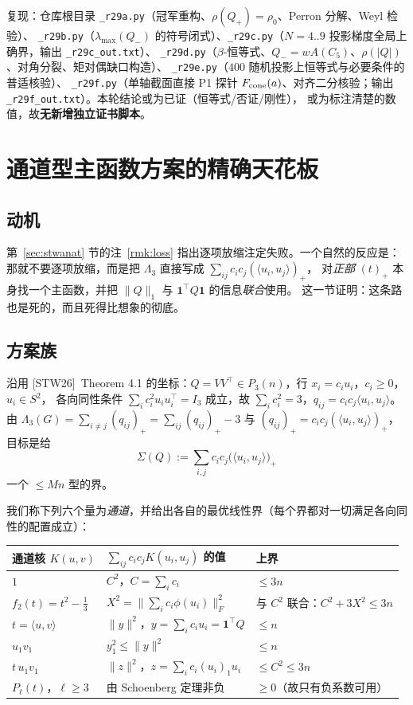 \documentclass[UTF8,11pt]{ctexart}
\theoremstyle{definition}
\newcommand{\Lam}{\Lambda}
\newcommand{\one}{\mathbf{1}}
\newcommand{\STW}{\textup{[STW26]}}
\begin{document}
复现：仓库根目录 \texttt{\_r29a.py}（冠军重构、$\rho(Q_+)=\rho_0$、Perron 分解、Weyl 检验）、
\texttt{\_r29b.py}（$\lambda_{\max}(Q_-)$ 的符号闭式）、\texttt{\_r29c.py}（$N=4..9$ 投影梯度全局上确界，输出 \texttt{\_r29c\_out.txt}）、
\texttt{\_r29d.py}（$\beta$-恒等式、$Q_-=wA(C_5)$、$\rho(|Q|)$、对角分裂、矩对偶缺口构造）、
\texttt{\_r29e.py}（$400$ 随机投影上恒等式与必要条件的普适核验）、
\texttt{\_r29f.py}（单轴截面直接 P1 探针 $F_{\rm cone}(a)$、对齐二分核验；输出 \texttt{\_r29f\_out.txt}）。本轮结论或为已证（恒等式/否证/刚性），
或为标注清楚的数值，故\textbf{无新增独立证书脚本}。

\section{通道型主函数方案的精确天花板}\label{sec:nogo}

\subsection{动机}

第~\ref{sec:stwanat} 节的注~\ref{rmk:loss} 指出逐项放缩注定失败。一个自然的反应是：
那就不要逐项放缩，而是把 $\Lam_3$ 直接写成 $\sum_{ij}c_ic_j(\langle u_i,u_j\rangle)_+$，
对\emph{正部} $(t)_+$ 本身找一个主函数，并把 $\|Q\|_1$ 与 $\one^\top Q\one$ 的信息\emph{联合}使用。
这一节证明：这条路也是死的，而且死得比想象的彻底。

\subsection{方案族}

沿用 \STW\ Theorem 4.1 的坐标：$Q=VV^\top\in P_3(n)$，行 $x_i=c_iu_i$，$c_i\ge0$，$u_i\in S^2$，
各向同性条件 $\sum_ic_i^2u_iu_i^\top=I_3$ 成立，故 $\sum_ic_i^2=3$，$q_{ij}=c_ic_j\langle u_i,u_j\rangle$。
由 $\Lam_3(G)=\sum_{i\ne j}(q_{ij})_+=\sum_{ij}(q_{ij})_+-3$ 与 $(q_{ij})_+=c_ic_j(\langle u_i,u_j\rangle)_+$，目标是给
\[
\Sigma(Q):=\sum_{i,j}c_ic_j\bigl(\langle u_i,u_j\rangle\bigr)_+
\]
一个 $\le Mn$ 型的界。

我们称下列六个量为\emph{通道}，并给出各自的最优线性界（每个界都对一切满足各向同性的配置成立）：
\begin{center}
{\small
\begin{tabular}{@{}lll@{}}
\toprule
通道核 $K(u,v)$ & $\sum_{ij}c_ic_jK(u_i,u_j)$ 的值 & 上界 \\
\midrule
$1$ & $C^2$，$C=\sum_ic_i$ & $\le 3n$ \\
$f_2(t)=t^2-\frac13$ & $X^2=\bigl\|\sum_ic_i\phi(u_i)\bigr\|_F^2$ & 与 $C^2$ 联合：$C^2+3X^2\le 3n$ \\
$t=\langle u,v\rangle$ & $\|y\|^2$，$y=\sum_ic_iu_i=\one^\top Q$ & $\le n$ \\
$u_1v_1$ & $y_1^2\le\|y\|^2$ & $\le n$ \\
$t\,u_1v_1$ & $\|z\|^2$，$z=\sum_ic_i(u_i)_1u_i$ & $\le C^2\le 3n$ \\
$P_\ell(t)$，$\ell\ge3$ & 由 Schoenberg 定理非负 & $\ge0$（故只有负系数可用） \\
\bottomrule
\end{tabular}}
\end{center}
\end{document}
